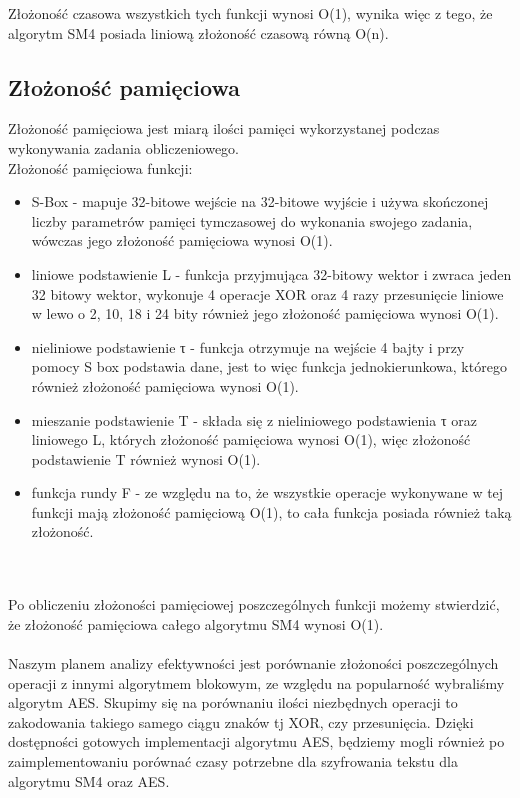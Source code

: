 Złożoność czasowa wszystkich tych funkcji wynosi O(1), wynika więc z tego, że algorytm SM4 posiada liniową złożoność czasową równą O(n).


\subsection{ Złożoność pamięciowa}
Złożoność pamięciowa jest miarą ilości pamięci wykorzystanej podczas wykonywania zadania obliczeniowego.\\

Złożoność pamięciowa funkcji:
\begin{itemize}
    \item S-Box - mapuje 32-bitowe wejście na 32-bitowe wyjście i używa skończonej liczby
parametrów pamięci tymczasowej do wykonania swojego zadania, wówczas jego złożoność pamięciowa wynosi O(1).
    \item liniowe podstawienie L - funkcja przyjmująca 32-bitowy wektor i zwraca jeden 32 bitowy wektor, wykonuje 4 operacje XOR oraz 4 razy przesunięcie liniowe w lewo o 2, 10, 18 i 24 bity również jego złożoność pamięciowa wynosi O(1).
    \item nieliniowe podstawienie τ - funkcja otrzymuje na wejście 4 bajty i przy pomocy S box podstawia dane, jest to więc funkcja jednokierunkowa, którego również złożoność pamięciowa wynosi O(1).
    \item mieszanie podstawienie T  - składa się z nieliniowego podstawienia τ oraz liniowego L, których złożoność pamięciowa wynosi O(1), więc złożoność podstawienie T również wynosi O(1).
    \item funkcja rundy F -  ze względu na to, że wszystkie operacje wykonywane w tej funkcji mają złożoność pamięciową O(1), to cała funkcja posiada również taką złożoność. \\

\end{itemize}\\\\

Po obliczeniu złożoności pamięciowej poszczególnych funkcji możemy stwierdzić, że złożoność pamięciowa całego algorytmu SM4 wynosi O(1).\\\\


Naszym planem analizy efektywności jest porównanie złożoności poszczególnych operacji z innymi algorytmem blokowym, ze względu na popularność wybraliśmy algorytm AES. Skupimy się na porównaniu ilości niezbędnych operacji to zakodowania takiego samego ciągu znaków tj XOR, czy przesunięcia. Dzięki dostępności gotowych implementacji algorytmu AES, będziemy mogli również po zaimplementowaniu porównać czasy potrzebne dla szyfrowania tekstu dla algorytmu SM4 oraz AES.\cite{design_thinking} 







